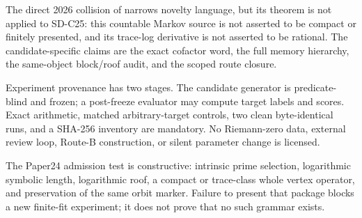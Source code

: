 The direct 2026 collision of \citet{deJong2026} narrows novelty language,
but its theorem is not applied to SD-C25: this countable Markov source is
not asserted to be compact or finitely presented, and its trace-log
derivative is not asserted to be rational.  The candidate-specific claims
are the exact cofactor word, the full memory hierarchy, the same-object
block/roof audit, and the scoped route closure.

Experiment provenance has two stages.  The candidate generator is
predicate-blind and frozen; a post-freeze evaluator may compute target
labels and scores.  Exact arithmetic, matched arbitrary-target controls,
two clean byte-identical runs, and a SHA-256 inventory are mandatory.  No
Riemann-zero data, external review loop, Route-B construction, or silent
parameter change is licensed.

The Paper24 admission test is constructive: intrinsic prime selection,
logarithmic symbolic length, logarithmic roof, a compact or trace-class
whole vertex operator, and preservation of the same orbit marker.  Failure
to present that package blocks a new finite-fit experiment; it does not
prove that no such grammar exists.
